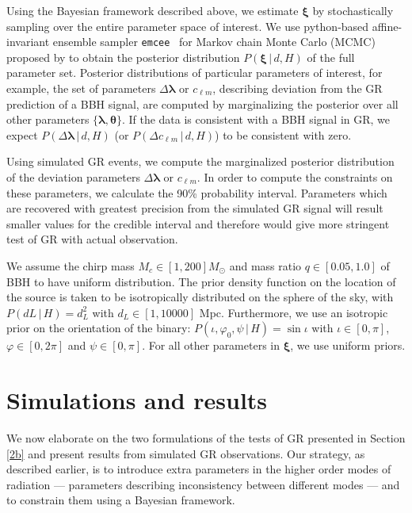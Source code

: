 \documentclass[prd,preprintnumbers,twocolumn,eqsecnum,floatfix,a4paper,nofootinbib,superscriptaddress]{revtex4}
\newcommand{\blambda}{\bm{\lambda}}
\newcommand{\btheta}{\bm{\theta}}
\newcommand{\bxi}{\bm{\xi}}
\begin{document}
Using the Bayesian framework described above, we estimate $\bxi$ by stochastically sampling over the entire parameter space of interest. We use python-based affine-invariant ensemble sampler \texttt{emcee}~\cite{foreman2013emcee} for Markov chain Monte Carlo (MCMC) proposed by \cite{goodman2010ensemble} to obtain the posterior distribution $P(\bxi \, | \, d, H)$ of the full parameter set. Posterior distributions of particular parameters of interest, for example,  the set of parameters ${\Delta \blambda}$ or $c_{\ell m}$, describing deviation from the GR prediction of a BBH signal, are computed  by marginalizing the posterior over all other parameters $\{\blambda, \btheta\}$. If the data is consistent with a BBH signal in GR, we expect $P(\Delta \blambda \, | \, d, H)$ (or $P(\Delta c_{\ell m} \, | \, d, H)$) to be consistent with zero. 

Using simulated GR events, we compute the marginalized posterior distribution of the deviation parameters  ${\Delta \blambda}$ or $c_{\ell m}$. In order to compute the constraints on these parameters, we calculate the 90\% probability interval. Parameters which are recovered with greatest precision from the simulated GR signal will result smaller values for the credible interval and therefore would give more stringent test of GR with actual observation.

We assume the chirp mass $M_c \in [1,200] M_\odot$ and mass ratio $q \in [0.05,1.0]$ of BBH to have uniform distribution. The prior density function on the location of the source is  taken  to  be  isotropically  distributed  on  the  sphere of  the  sky,  with $P({dL} \, | \, H)=d_{L}^{2}$ with $d_L \in [1,10000]$ Mpc. Furthermore, we use an  isotropic  prior  on  the  orientation  of  the  binary: $P({\iota,\varphi_0,\psi} \, | \, H)=\sin\iota$ with $\iota \in [0,\pi]$, $\varphi \in [0,2\pi]$ and $\psi \in [0,\pi]$. For all other parameters in $\bxi$, we use uniform priors.


\section{Simulations and results}
\label{sec:simulations}

We now elaborate on the two formulations of the tests of GR presented in Section \ref{2b} and present results from simulated GR observations. Our strategy, as described earlier, is to introduce extra parameters in the higher order modes of radiation --- parameters describing inconsistency between different modes --- and to constrain them using a Bayesian framework. 
\end{document}
